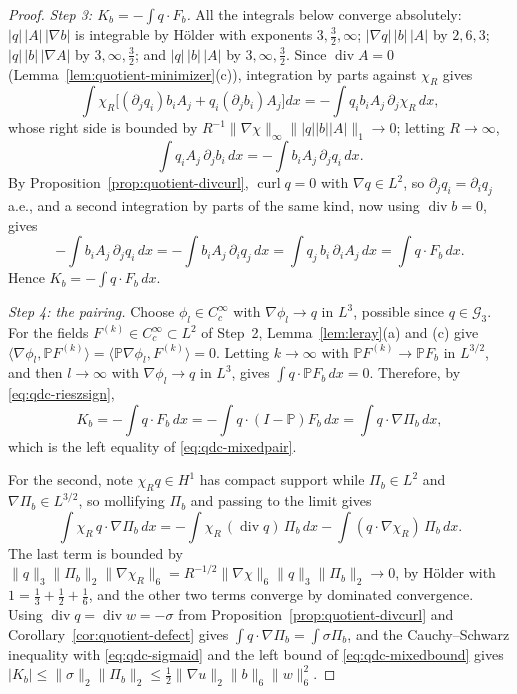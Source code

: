 \documentclass[11pt]{article}
\theoremstyle{definition}
\theoremstyle{plain}
\newcommand{\norm}[1]{\lVert #1\rVert}
\begin{document}
\begin{proof}
\emph{Step 3: $K_b=-\int q\cdot F_b$.}  All the integrals below converge
absolutely: $|q|\,|A|\,|\nabla b|$ is integrable by H\"older with exponents
$3,\frac32,\infty$; $|\nabla q|\,|b|\,|A|$ by $2,6,3$; $|q|\,|b|\,|\nabla A|$
by $3,\infty,\frac32$; and $|q|\,|b|\,|A|$ by $3,\infty,\frac32$.  Since
$\operatorname{div}A=0$ (Lemma~\ref{lem:quotient-minimizer}(c)),
integration by parts against $\chi_R$ gives
\[
 \int\chi_R\bigl[(\partial_jq_i)b_iA_j+q_i(\partial_jb_i)A_j\bigr]dx
 =-\int q_ib_iA_j\,\partial_j\chi_R\,dx,
\]
whose right side is bounded by
$R^{-1}\norm{\nabla\chi}_\infty\norm{|q||b||A|}_1\to0$; letting $R\to\infty$,
\[
 \int q_iA_j\,\partial_jb_i\,dx=-\int b_iA_j\,\partial_jq_i\,dx .
\]
By Proposition~\ref{prop:quotient-divcurl}, $\operatorname{curl}q=0$ with
$\nabla q\in L^2$, so $\partial_jq_i=\partial_iq_j$ a.e., and a second
integration by parts of the same kind, now using $\operatorname{div}b=0$,
gives
\[
 -\int b_iA_j\,\partial_jq_i\,dx=-\int b_iA_j\,\partial_iq_j\,dx
 =\int q_j\,b_i\,\partial_iA_j\,dx=\int q\cdot F_b\,dx .
\]
Hence $K_b=-\int q\cdot F_b\,dx$.

\emph{Step 4: the pairing.}  Choose $\phi_l\in C_c^\infty$ with
$\nabla\phi_l\to q$ in $L^3$, possible since $q\in\mathcal G_3$.  For the
fields $F^{(k)}\in C_c^\infty\subset L^2$ of Step~2, Lemma~\ref{lem:leray}(a)
and (c) give
$\langle\nabla\phi_l,\mathbb PF^{(k)}\rangle
=\langle\mathbb P\nabla\phi_l,F^{(k)}\rangle=0$.  Letting $k\to\infty$ with
$\mathbb PF^{(k)}\to\mathbb PF_b$ in $L^{3/2}$, and then $l\to\infty$ with
$\nabla\phi_l\to q$ in $L^3$, gives $\int q\cdot\mathbb PF_b\,dx=0$.
Therefore, by \eqref{eq:qdc-rieszsign},
\[
 K_b=-\int q\cdot F_b\,dx
 =-\int q\cdot(I-\mathbb P)F_b\,dx
 =\int q\cdot\nabla\Pi_b\,dx ,
\]
which is the left equality of \eqref{eq:qdc-mixedpair}.

For the second, note $\chi_Rq\in H^1$ has compact support while
$\Pi_b\in L^2$ and $\nabla\Pi_b\in L^{3/2}$, so mollifying $\Pi_b$ and
passing to the limit gives
\[
 \int\chi_R\,q\cdot\nabla\Pi_b\,dx
 =-\int\chi_R\,(\operatorname{div}q)\,\Pi_b\,dx
 -\int(q\cdot\nabla\chi_R)\,\Pi_b\,dx .
\]
The last term is bounded by
$\norm q_3\norm{\Pi_b}_2\norm{\nabla\chi_R}_6
=R^{-1/2}\norm{\nabla\chi}_6\norm q_3\norm{\Pi_b}_2\to0$, by H\"older with
$1=\frac13+\frac12+\frac16$, and the other two terms converge by dominated
convergence.  Using
$\operatorname{div}q=\operatorname{div}w=-\sigma$ from
Proposition~\ref{prop:quotient-divcurl} and
Corollary~\ref{cor:quotient-defect} gives
$\int q\cdot\nabla\Pi_b=\int\sigma\Pi_b$, and the Cauchy--Schwarz inequality
with \eqref{eq:qdc-sigmaid} and the left bound of
\eqref{eq:qdc-mixedbound} gives
$|K_b|\le\norm\sigma_2\norm{\Pi_b}_2\le\frac12\norm{\nabla u}_2\norm b_6\norm w_6^2$.


\end{proof}
\end{document}
